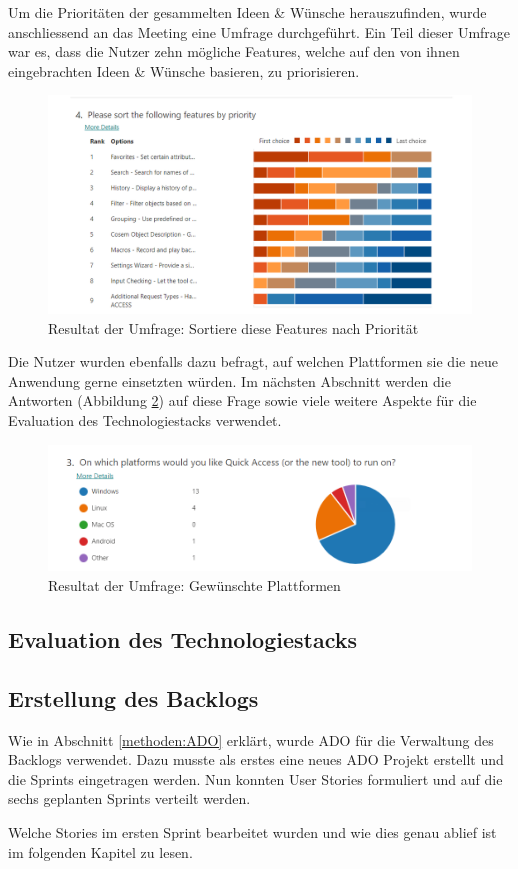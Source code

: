 Um die Prioritäten der gesammelten Ideen \& Wünsche herauszufinden, wurde anschliessend an das Meeting eine Umfrage durchgeführt.
Ein Teil dieser Umfrage war es, dass die Nutzer zehn mögliche Features, welche auf den von ihnen eingebrachten Ideen \& Wünsche basieren, zu priorisieren.


\begin{figure}[H]
   \centering
   \includegraphics[width=1.0\textwidth]{gfx/S1_Survey_Prio.png}
   \caption{
       Resultat der Umfrage: Sortiere diese Features nach Priorität
   }
   \label{fig:FeaturesPrio}
\end{figure}

Die Nutzer wurden ebenfalls dazu befragt, auf welchen Plattformen sie die neue Anwendung gerne einsetzten würden.
Im nächsten Abschnitt werden die Antworten (Abbildung \ref{fig:SurveryPlatforms}) auf diese Frage sowie viele weitere Aspekte für die Evaluation des Technologiestacks verwendet.

\begin{figure}[H]
   \centering
   \includegraphics[width=1.0\textwidth]{gfx/S0_Survey_Platform.png}
   \caption{
       Resultat der Umfrage: Gewünschte Plattformen
   }
   \label{fig:SurveryPlatforms}
\end{figure}

\subsection{Evaluation des Technologiestacks}

\subsection{Erstellung des Backlogs}
Wie in Abschnitt \ref{methoden:ADO} erklärt, wurde \ac{ADO} für die Verwaltung des Backlogs verwendet.
Dazu musste als erstes eine neues \ac{ADO} Projekt erstellt und die Sprints eingetragen werden.
Nun konnten User Stories formuliert und auf die sechs geplanten Sprints verteilt werden.



Welche Stories im ersten Sprint bearbeitet wurden und wie dies genau ablief ist im folgenden Kapitel zu lesen.

